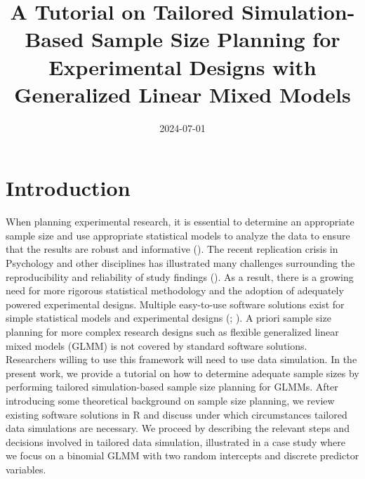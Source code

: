 \documentclass[
  man,
  floatsintext,
  longtable,
  a4paper,
  nolmodern,
  notxfonts,
  notimes,
  colorlinks=true,linkcolor=blue,citecolor=blue,urlcolor=blue]{apa7}
\title{A Tutorial on Tailored Simulation-Based Sample Size Planning for
Experimental Designs with Generalized Linear Mixed Models}
\date{2024-07-01}
\begin{document}
\maketitle


\setcounter{secnumdepth}{-\maxdimen} %

\setlength\LTleft{0pt}


\section{Introduction}\label{introduction}

When planning experimental research, it is essential to determine an
appropriate sample size and use appropriate statistical models to
analyze the data to ensure that the results are robust and informative
(). The
recent replication crisis in Psychology and other disciplines has
illustrated many challenges surrounding the reproducibility and
reliability of study findings
(). As a
result, there is a growing need for more rigorous statistical
methodology and the adoption of adequately powered experimental designs.
Multiple easy-to-use software solutions exist for simple statistical
models and experimental designs (;
). A priori sample size planning for more complex
research designs such as flexible generalized linear mixed models (GLMM)
is not covered by standard software solutions. Researchers willing to
use this framework will need to use data simulation. In the present
work, we provide a tutorial on how to determine adequate sample sizes by
performing tailored simulation-based sample size planning for GLMMs.
After introducing some theoretical background on sample size planning,
we review existing software solutions in R and discuss under which
circumstances tailored data simulations are necessary. We proceed by
describing the relevant steps and decisions involved in tailored data
simulation, illustrated in a case study where we focus on a binomial
GLMM with two random intercepts and discrete predictor variables.
\end{document}
